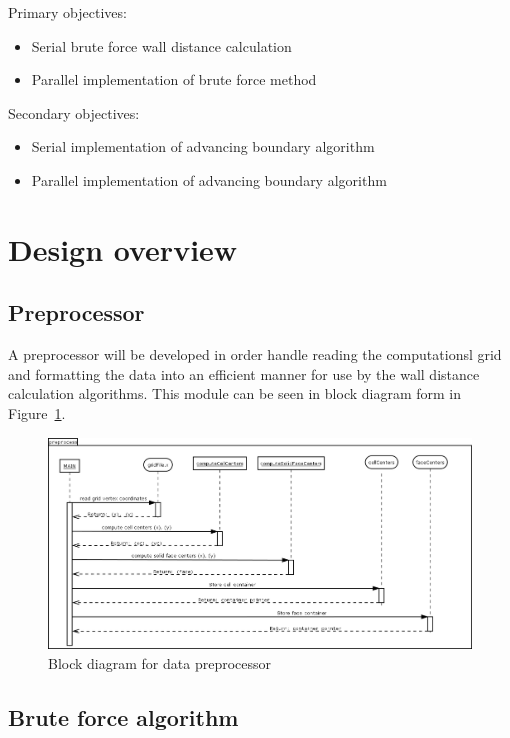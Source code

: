 \documentclass[]{aiaa-tc}%
\begin{document}
Primary objectives:
\begin{itemize}
  \item Serial brute force wall distance calculation
  \item Parallel implementation of brute force method
\end{itemize}

Secondary objectives:
\begin{itemize}
  \item Serial implementation of advancing boundary algorithm
  \item Parallel implementation of advancing boundary algorithm
\end{itemize}

\section{Design overview}

\subsection{Preprocessor}
A preprocessor will be developed in order handle reading the computationsl grid and
formatting the data into an efficient manner for use by the wall
distance calculation algorithms. This module can be seen in block
diagram form in Figure~\ref{f:preprocessor_block}.

\begin{figure}
  \includegraphics{figures/preprocessor/preprocessor_block}
  \caption{Block diagram for data preprocessor}
  \label{f:preprocessor_block}
\end{figure}


\subsection{Brute force algorithm}
\end{document}
